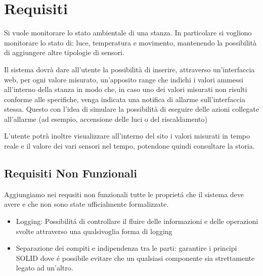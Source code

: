 \section{Requisiti}

Si vuole monitorare lo stato ambientale di una stanza. In particolare si vogliono monitorare lo stato di: luce, temperatura e movimento, mantenendo la possibilità di aggiungere altre tipologie di sensori.

Il sistema dovrà dare all'utente la possibilità di inserire, attraverso un'interfaccia web, per ogni valore misurato, un'apposito range che indichi i valori ammessi all'interno della stanza in modo che, in caso uno dei valori misurati non risulti conforme alle specifiche, venga indicata una notifica di allarme sull'interfaccia stessa. Questo con l'idea di simulare la possibilità di eseguire delle azioni collegate all'allarme (ad esempio, accensione delle luci o del riscaldamento)

L'utente potrà inoltre visualizzare all'interno del sito i valori misurati in tempo reale e il valore dei vari sensori nel tempo, potendone quindi consultare la storia.

\subsection{Requisiti Non Funzionali}

Aggiungiamo nei requsiti non funzionali tutte le propriet\'a che il sistema deve avere e che non sono state ufficialmente formalizzate.

\begin{itemize}
  \item Logging: Possibilit\'a di controllare il fluire delle informazioni e delle operazioni svolte attraverso una qualsivoglia forma di logging
  \item Separazione dei compiti e indipendenza tra le parti: garantire i principi SOLID dove \'e possibile evitare che un qualsiasi componente sia strettamente legato ad un'altro.
\end{itemize}
